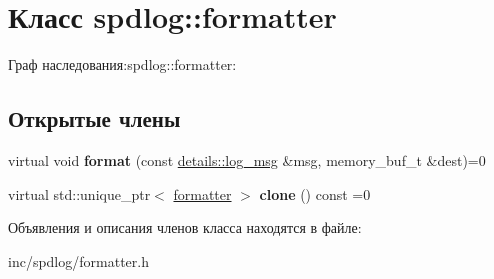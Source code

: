 \hypertarget{classspdlog_1_1formatter}{}\section{Класс spdlog\+:\+:formatter}
\label{classspdlog_1_1formatter}


Граф наследования\+:spdlog\+:\+:formatter\+:
\subsection*{Открытые члены}
\begin{DoxyCompactItemize}
\item 
\mbox{\label{classspdlog_1_1formatter_a834e3bee6555ae482005f0f1ff5c6619}} 
virtual void {\bfseries format} (const \hyperlink{structspdlog_1_1details_1_1log__msg}{details\+::log\+\_\+msg} \&msg, memory\+\_\+buf\+\_\+t \&dest)=0
\item 
\mbox{\label{classspdlog_1_1formatter_ae9857a794904d98a4a9527a742e37129}} 
virtual std\+::unique\+\_\+ptr$<$ \hyperlink{classspdlog_1_1formatter}{formatter} $>$ {\bfseries clone} () const =0
\end{DoxyCompactItemize}


Объявления и описания членов класса находятся в файле\+:\begin{DoxyCompactItemize}
\item 
inc/spdlog/formatter.\+h\end{DoxyCompactItemize}
